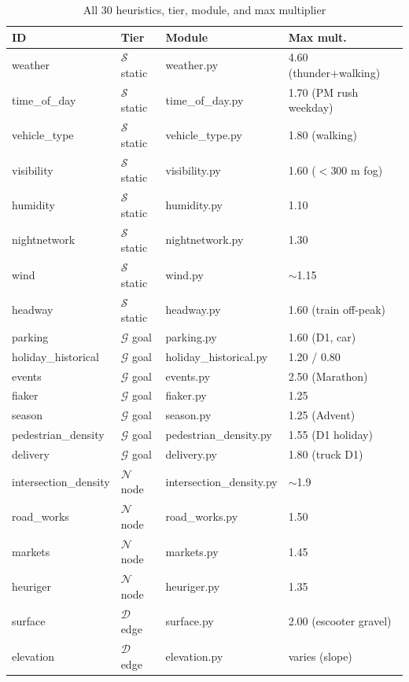 \documentclass[11pt,a4paper]{article}
\begin{document}
\begin{table}[H]
\centering\scriptsize
\caption{All 30 heuristics, tier, module, and max multiplier}
\begin{tabular}{llll}
\toprule
\textbf{ID} & \textbf{Tier} & \textbf{Module} & \textbf{Max mult.} \\
\midrule
weather & $\mathcal{S}$ static & weather.py & 4.60 (thunder+walking) \\
time\_of\_day & $\mathcal{S}$ static & time\_of\_day.py & 1.70 (PM rush weekday) \\
vehicle\_type & $\mathcal{S}$ static & vehicle\_type.py & 1.80 (walking) \\
visibility & $\mathcal{S}$ static & visibility.py & 1.60 ($<$300 m fog) \\
humidity & $\mathcal{S}$ static & humidity.py & 1.10 \\
nightnetwork & $\mathcal{S}$ static & nightnetwork.py & 1.30 \\
wind & $\mathcal{S}$ static & wind.py & $\sim$1.15 \\
headway & $\mathcal{S}$ static & headway.py & 1.60 (train off-peak) \\
\midrule
parking & $\mathcal{G}$ goal & parking.py & 1.60 (D1, car) \\
holiday\_historical & $\mathcal{G}$ goal & holiday\_historical.py & 1.20 / 0.80 \\
events & $\mathcal{G}$ goal & events.py & 2.50 (Marathon) \\
fiaker & $\mathcal{G}$ goal & fiaker.py & 1.25 \\
season & $\mathcal{G}$ goal & season.py & 1.25 (Advent) \\
pedestrian\_density & $\mathcal{G}$ goal & pedestrian\_density.py & 1.55 (D1 holiday) \\
delivery & $\mathcal{G}$ goal & delivery.py & 1.80 (truck D1) \\
\midrule
intersection\_density & $\mathcal{N}$ node & intersection\_density.py & $\sim$1.9 \\
road\_works & $\mathcal{N}$ node & road\_works.py & 1.50 \\
markets & $\mathcal{N}$ node & markets.py & 1.45 \\
heuriger & $\mathcal{N}$ node & heuriger.py & 1.35 \\
\midrule
surface & $\mathcal{D}$ edge & surface.py & 2.00 (escooter gravel) \\
elevation & $\mathcal{D}$ edge & elevation.py & varies (slope) \\

\end{tabular}
\end{table}
\end{document}
